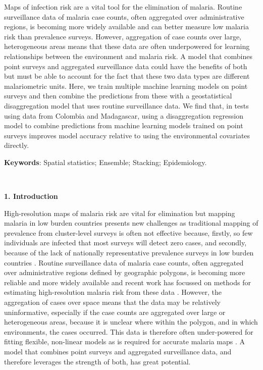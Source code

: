\documentclass[11pt]{article}
\begin{document}
{Maps of infection risk are a vital tool for the elimination of malaria.
Routine surveillance data of malaria case counts, often aggregated over administrative regions, is becoming more widely available and can better measure low malaria risk than prevalence surveys.
However, aggregation of case counts over large, heterogeneous areas means that these data are often underpowered for learning relationships between the environment and malaria risk.
A model that combines point surveys and aggregated surveillance data could have the benefits of both but must be able to account for the fact that these two data types are different malariometric units.
Here, we train multiple machine learning models on point surveys and then combine the predictions from these with a geostatistical disaggregation model that uses routine surveillance data.
We find that, in tests using data from Colombia and Madagascar, using a disaggregation regression model to combine predictions from machine learning models trained on point surveys improves model accuracy relative to using the environmental covariates directly.

{\bf Keywords}: Spatial statistics; Ensemble; Stacking; Epidemiology.
}\\


\setlength{\parindent}{0pt}

{\bf 1. Introduction}



High-resolution maps of malaria risk are vital for elimination but mapping malaria in low burden countries presents new challenges as traditional mapping of prevalence from cluster-level surveys \citep{gething2011new, bhatt2017improved, gething2012long, bhatt2015effect} is often not effective  because, firstly, so few individuals are infected that most surveys will detect zero cases, and secondly, because of the lack of nationally representative prevalence surveys in low burden countries \citep{sturrock2016mapping, sturrock2014fine}. 
Routine surveillance data of malaria case counts, often aggregated over administrative regions defined by geographic polygons, is becoming more reliable and more widely available \citep{sturrock2016mapping} and recent work has focussed on methods for estimating high-resolution malaria risk from these data \citep{sturrock2014fine, wilson2017pointless, law2018variational, taylor2017continuous, li2012log}. 
However, the aggregation of cases over space means that the data may be relatively uninformative, especially if the case counts are aggregated over large or heterogeneous areas, because it is unclear where within the polygon, and in which environments, the cases occurred. 
This data is therefore often under-powered for fitting flexible, non-linear models as is required for accurate malaria maps \citep{bhatt2017improved, bhatt2015effect}. 
A model that combines point surveys and aggregated surveillance data, and therefore leverages the strength of both, has great potential.
 
\end{document}
